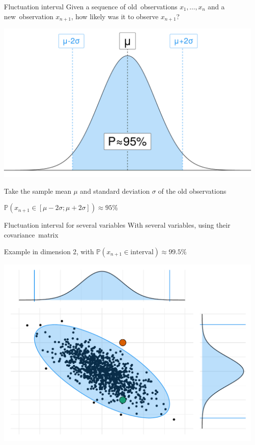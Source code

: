 \documentclass[10pt]{beamer}
\begin{document}
\begin{frame}{Fluctuation interval}
    Given a sequence of \alert{old~observations} $x_1, \dots, x_n$ and a \alert{new~observation} $x_{n+1}$, how likely
    was it to observe $x_{n+1}$?

    \begin{minipage}{0.5\linewidth}
        \begin{center}
            \includegraphics[width=\linewidth]{img/slides/normal.pdf}
        \end{center}
    \end{minipage}\hfill%
    \begin{minipage}{0.48\linewidth}
        Take the sample mean \(\mu\) and standard deviation \(\sigma\) of the old observations

        \medbreak

        \(\mathbb{P}\left(x_{n+1}\in\left[\mu-2\sigma;\mu+2\sigma\right]\right) \approx 95\%\)
    \end{minipage}
\end{frame}

\begin{frame}{Fluctuation interval for several variables}
    With several variables, using their \alert{covariance~matrix}

    Example in dimension 2, with \(\mathbb{P}(x_{n+1} \in \text{interval}) \approx 99.5\%\)

    \begin{center}
        \includegraphics[width=0.8\linewidth]{img/experiment/non_regression/statistics/single_point.pdf}
    \end{center}
\end{frame}
\end{document}
